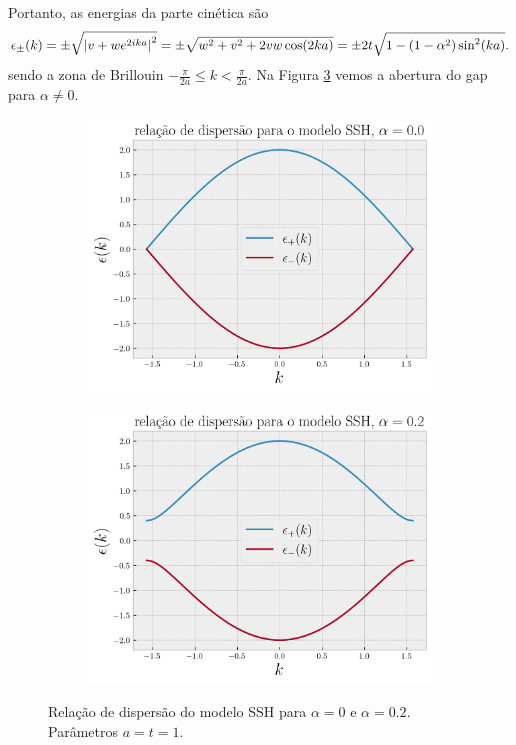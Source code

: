 \documentclass[a4paper,10pt]{article}
\begin{document}
Portanto, as energias da parte cinética são
$$
\epsilon_\pm(k) = \pm \sqrt{\abs{v + w e^{2ika}}^2} = \pm \sqrt{w^2 + v^2 + 2 vw \cos(2ka)} =
\pm 2t \sqrt{1 - (1-\alpha^2) \sin[2](ka) }.
$$
sendo a zona de Brillouin $-\frac{\pi}{2a} \leq k < \frac{\pi}{2a}$. Na Figura \ref{fig:eps-ssh} vemos a abertura do gap para $\alpha \neq 0$.
\begin{figure}[H]
\centering
\begin{subfigure}{.45\textwidth}
  \centering
  \includegraphics[width=\linewidth]{fig/eps_ssh_alpha0.png}
  \label{fig:ssh-alpha0}
\end{subfigure}
\begin{subfigure}{.45\textwidth}
  \centering
  \includegraphics[width=\linewidth]{fig/eps_ssh_alphanot0.png}
  \label{fig:ssh-alphanot0}
\end{subfigure}
\caption{Relação de dispersão do modelo SSH para $\alpha = 0$ e $\alpha = 0.2$. Parâmetros $a = t = 1$.}
\label{fig:eps-ssh}
\end{figure}
\end{document}
